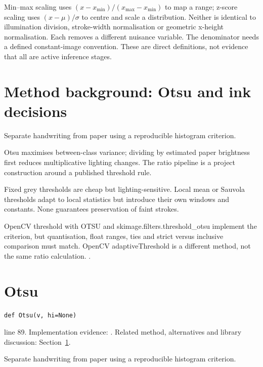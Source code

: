 Min--max scaling uses $(x-x_{\min})/(x_{\max}-x_{\min})$ to map a range;
z-score scaling uses $(x-\mu)/\sigma$ to centre and scale a distribution.
Neither is identical to illumination division, stroke-width normalisation or
geometric x-height normalisation. Each removes a different nuisance variable.
The denominator needs a defined constant-image convention. These are direct
definitions, not evidence that all are active inference stages.


\section{Method background: Otsu and ink decisions}\label{method:threshold}
Separate handwriting from paper using a reproducible histogram criterion.


Otsu maximises between-class variance; dividing by estimated paper brightness first reduces multiplicative lighting changes. The ratio pipeline is a project construction around a published threshold rule.


Fixed grey thresholds are cheap but lighting-sensitive. Local mean or Sauvola thresholds adapt to local statistics but introduce their own windows and constants. None guarantees preservation of faint strokes.


OpenCV threshold with OTSU and skimage.filters.threshold\_otsu implement the criterion, but quantisation, float ranges, ties and strict versus inclusive comparison must match. OpenCV adaptiveThreshold is a different method, not the same ratio calculation. \cite{otsu1979,sauvola2000,opencvthreshold}.


\section{Otsu}\label{fn:segment:Otsu}
\begin{lstlisting}[style=sig]
def Otsu(v, hi=None)
\end{lstlisting}
 line 89. Implementation evidence: \cite{code2026}. Related method, alternatives and library discussion: Section~\ref{method:threshold}.


Separate handwriting from paper using a reproducible histogram criterion.




